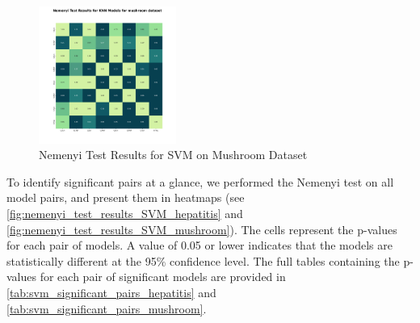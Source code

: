 \begin{figure}
    \centering
    \includegraphics[width=0.4\textwidth]{figures/nemenyi_test_results_SVM_mushroom.png}
    \caption{Nemenyi Test Results for SVM on Mushroom Dataset}
    \label{fig:nemenyi_test_results_SVM_mushroom}
\end{figure}

To identify significant pairs at a glance, we performed the Nemenyi test on all model pairs,
and present them in heatmaps (see \autoref{fig:nemenyi_test_results_SVM_hepatitis} and \autoref{fig:nemenyi_test_results_SVM_mushroom}).
The cells represent the p-values for each pair of models. A value of 0.05 or lower indicates that the models are statistically different
at the 95\% confidence level. The full tables containing the p-values for each pair of significant models are provided in \autoref{tab:svm_significant_pairs_hepatitis} and \autoref{tab:svm_significant_pairs_mushroom}.




